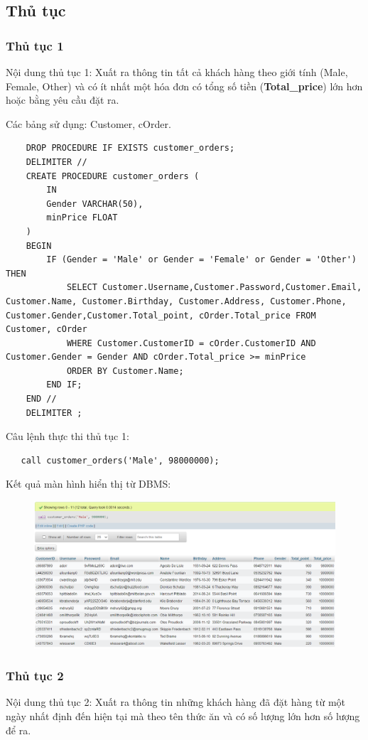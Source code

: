 \subsection{Thủ tục}
\subsubsection{Thủ tục 1}
Nội dung thủ tục 1: Xuất ra thông tin tất cả khách hàng theo giới tính (Male, Female, Other) và có ít nhất một hóa đơn có tổng số tiền (\textbf{Total\_price}) lớn hơn hoặc bằng yêu cầu đặt ra.

Các bảng sử dụng: Customer, cOrder.
\begin{verbatim}
    DROP PROCEDURE IF EXISTS customer_orders;
    DELIMITER //
    CREATE PROCEDURE customer_orders (
        IN
        Gender VARCHAR(50),
        minPrice FLOAT
    )
    BEGIN
        IF (Gender = 'Male' or Gender = 'Female' or Gender = 'Other') THEN
            SELECT Customer.Username,Customer.Password,Customer.Email, Customer.Name, Customer.Birthday, Customer.Address, Customer.Phone, Customer.Gender,Customer.Total_point, cOrder.Total_price FROM Customer, cOrder
            WHERE Customer.CustomerID = cOrder.CustomerID AND Customer.Gender = Gender AND cOrder.Total_price >= minPrice
            ORDER BY Customer.Name;
        END IF;
    END //
    DELIMITER ;
\end{verbatim}
Câu lệnh thực thi thủ tục 1:
\begin{verbatim}
   call customer_orders('Male', 98000000);
\end{verbatim}
\newpage
Kết quả màn hình hiển thị từ DBMS:
\begin{figure}[h]
    \centering
    \includegraphics[scale=0.5]{images/customercOrder.png}
\end{figure}
\subsubsection{Thủ tục 2}
Nội dung thủ tục 2: Xuất ra thông tin những khách hàng đã đặt hàng từ một ngày nhất định đến hiện tại mà theo tên thức ăn và có số lượng lớn hơn số lượng để ra.  

